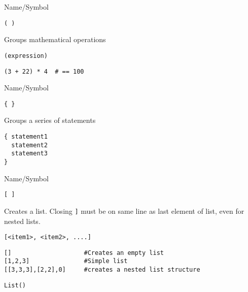 \rl

\begin{desc}{Name/Symbol}

\item[Name/Symbol] \verb+( )+                  

\item[Description] Groups mathematical operations

\item[Usage]      \verb+(expression)+

\item[Example]
\begin{verbatim}
(3 + 22) * 4  # == 100
\end{verbatim}

\item[See Also]     

\end{desc}

\rl

\begin{desc}{Name/Symbol}

\item[Name/Symbol] \verb!{ }!                  

\item[Description] Groups a series of statements

\item[Usage]
\begin{verbatim}
{ statement1
  statement2
  statement3
}
\end{verbatim}
	     

\item[Example]     

\item[See Also]     
\end{desc}

\rl

\begin{desc}{Name/Symbol}

\item[Name/Symbol] \verb+[ ]+                 

\item[Description]  Creates a list. Closing \verb+]+ must be on
 	      same line as last element of list, even
	      for nested lists.

\item[Usage]       \verb+[<item1>, <item2>, ....]+
            

\item[Example]
\begin{verbatim}
[]                    #Creates an empty list
[1,2,3]               #Simple list
[[3,3,3],[2,2],0]     #creates a nested list structure
\end{verbatim}


\item[See Also]     \texttt{List()}
\end{desc}

